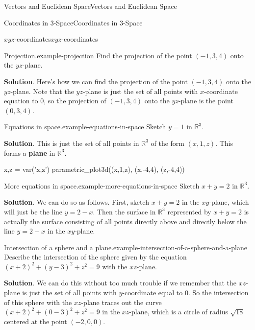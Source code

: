 \documentclass[10pt,]{book}
\newcommand{\terminology}[1]{\textbf{#1}}
\numberwithin{equation}{section}
\newcommand{\RR}{\mathbb{R}}
\begin{document}
\begin{chapterptx}{Vectors and Euclidean Space}{}{Vectors and Euclidean Space}{}{}
\begin{sectionptx}{Coordinates in 3-Space}{}{Coordinates in 3-Space}{}{}
\begin{subsectionptx}{\(xyz\)-coordinates}{}{\(xyz\)-coordinates}{}{}
\begin{example}{Projection.}{example-projection}
\hypertarget{p-848}{}%
Find the projection of the point \((-1,3,4)\) onto the \(yz\)-plane.%
\par\smallskip%
\noindent\textbf{Solution}.\hypertarget{solution-162}{}\quad%
\hypertarget{p-849}{}%
Here's how we can find the projection of the point \((-1,3,4)\) onto the \(yz\)-plane. Note that the \(yz\)-plane is just the set of all points with \(x\)-coordinate equation to \(0\), so the projection of \((-1,3,4)\) onto the \(yz\)-plane is the point \((0,3,4)\).%
\end{example}
\begin{example}{Equations in space.}{example-equations-in-space}%
\hypertarget{p-850}{}%
Sketch \(y=1\) in \(\RR^{3}\).%
\par\smallskip%
\noindent\textbf{Solution}.\hypertarget{solution-163}{}\quad%
\hypertarget{p-851}{}%
This is just the set of all points in \(\RR^{3}\) of the form \((x,1,z)\). This forms a \terminology{plane} in \(\RR^{3}\).%
\end{example}
\begin{sageinput}
x,z = var('x,z')
parametric_plot3d((x,1,z), (x,-4,4), (z,-4,4))
\end{sageinput}
\begin{example}{More equations in space.}{example-more-equations-in-space}%
\hypertarget{p-852}{}%
Sketch \(x+y=2\) in \(\RR^{3}\).%
\par\smallskip%
\noindent\textbf{Solution}.\hypertarget{solution-164}{}\quad%
\hypertarget{p-853}{}%
We can do so as follows. First, sketch \(x+y=2\) in the \(xy\)-plane, which will just be the line \(y = 2-x\). Then the surface in \(\RR^{3}\) represented by \(x+y=2\) is actually the surface consisting of all points directly above and directly below the line \(y=2-x\) in the \(xy\)-plane.%
\end{example}
\begin{example}{Intersection of a sphere and a plane.}{example-intersection-of-a-sphere-and-a-plane}%
\hypertarget{p-854}{}%
Describe the intersection of the sphere given by the equation \((x+2)^{2} + (y-3)^{2} + z^{2} = 9\) with the \(xz\)-plane.%
\par\smallskip%
\noindent\textbf{Solution}.\hypertarget{solution-165}{}\quad%
\hypertarget{p-855}{}%
We can do this without too much trouble if we remember that the \(xz\)-plane is just the set of all points with \(y\)-coordinate equal to \(0\). So the intersection of this sphere with the \(xz\)-plane traces out the curve \((x+2)^{2} + (0-3)^{2} + z^{2} = 9\) in the \(xz\)-plane, which is a circle of radius \(\sqrt{18}\) centered at the point \((-2,0,0)\).%

\end{example}
\end{subsectionptx}
\end{sectionptx}
\end{chapterptx}
\end{document}

